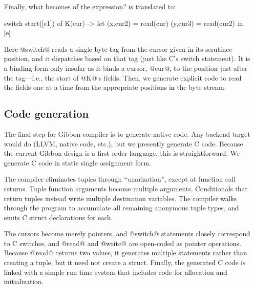 \documentclass[a4paper,english]{lipics-v2016}
\newcommand{\treelang}{Gibbon\xspace} %
\newcommand{\treecomp}{Gibbon compiler{}}
\begin{document}
Finally, what becomes of the  expression?   is
translated to:

\begin{code}
  switch start([e1]) of
    K(cur) -> let (x,cur2) = read(cur)
                  (y,cur3) = read(cur2)
              in [e]
\end{code}

Here @switch@ reads a single byte tag from the cursor given in its scrutinee
position, and it dispatches based on that tag (just like C's switch statement).
It is a binding form only insofar as it binds a cursor, @cur@, to the position
just after the tag---i.e., the start of @K@'s fields.  Then, we generate
explicit code to read the fields one at a time from the appropriate positions in
the byte stream.

\subsection{Code generation}
\label{subsec:codegen}

The final step for \treecomp{} is to generate native code.  Any backend target
would do (LLVM, native code, etc.), but we presently generate C code.
%
Because the current \treelang design is a {first order} language,
this is straightforward.  We generate C code in static single assignment form.

The compiler eliminates tuples through ``unarization'', except at function call
returns.  Tuple function arguments become multiple arguments.  Conditionals that
return tuples instead write multiple destination variables.  The compiler walks
through the program to accumulate all remaining anonymous tuple types, and emits
C struct declarations for each.

The cursors become merely  pointers, and 
%
@switch@ statements closely correspond to C switches, and @read@ and @write@ are
open-coded as pointer operations.  Because @read@ returns two values, it
generates multiple statements rather than creating a tuple, but it need not
create a struct.
%
%
Finally, the generated C code is linked with a simple run time system that
includes code for allocation and initialization.
\end{document}
